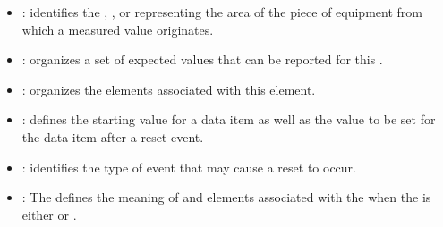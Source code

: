 \begin{itemize}
\item {} :  identifies the , , or  representing the area of the piece of equipment from which a measured value originates.
\item {} :  \glspl{organize} a set of expected values that can be reported for this .
\item {} :  \glspl{organize} the  elements associated with this  element. 
\item {} :  defines the starting value for a data item as well as the value to be set for the data item after a reset event.
\item {} :  identifies the type of event that may cause a reset to occur.
\item {} : The  defines the meaning of  and  elements associated with the  when the  is either  or .
\end{itemize}

